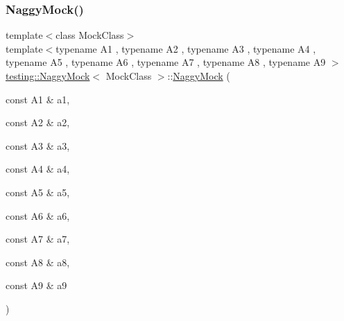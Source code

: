 \mbox{\label{classtesting_1_1NaggyMock_a786f31ade7b8b9f6e78e07f51cc0e14b}} 
\subsubsection{\texorpdfstring{NaggyMock()}{NaggyMock()}\hspace{0.1cm}{\footnotesize\ttfamily [10/11]}}
{\footnotesize\ttfamily template$<$class Mock\+Class$>$ \\
template$<$typename A1 , typename A2 , typename A3 , typename A4 , typename A5 , typename A6 , typename A7 , typename A8 , typename A9 $>$ \\
\mbox{\hyperlink{classtesting_1_1NaggyMock}{testing\+::\+Naggy\+Mock}}$<$ Mock\+Class $>$\+::\mbox{\hyperlink{classtesting_1_1NaggyMock}{Naggy\+Mock}} (\begin{DoxyParamCaption}\item[{const A1 \&}]{a1,  }\item[{const A2 \&}]{a2,  }\item[{const A3 \&}]{a3,  }\item[{const A4 \&}]{a4,  }\item[{const A5 \&}]{a5,  }\item[{const A6 \&}]{a6,  }\item[{const A7 \&}]{a7,  }\item[{const A8 \&}]{a8,  }\item[{const A9 \&}]{a9 }\end{DoxyParamCaption})\hspace{0.3cm}{\ttfamily [inline]}}

\mbox{\label{classtesting_1_1NaggyMock_aa40a39806b939f423696f9380de3172b}} 
